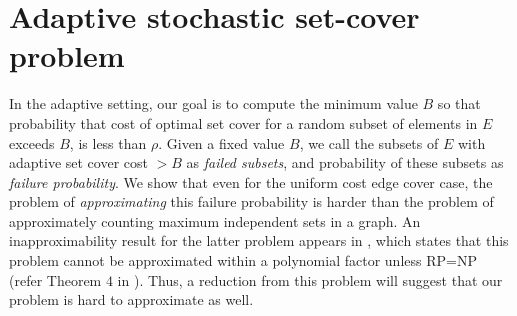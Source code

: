 \documentclass[11pt,onecolumn]{article}
\begin{document}
\section{Adaptive stochastic set-cover problem}
In the adaptive setting, our goal is to compute the minimum value $B$ so that probability that cost of optimal set cover for a random subset of elements in $E$ exceeds $B$, is less than $\rho$. Given a fixed value $B$, we call the subsets of $E$ with adaptive set cover cost $>B$ as {\it failed subsets}, and probability of these subsets as {\it failure probability}. We show that even for the uniform cost edge cover case, the problem of {\it approximating} this failure probability is harder than the problem of approximately counting maximum independent sets in a graph. 
An inapproximability result for the latter problem appears in \cite{luby-counting}, which states that this problem cannot be approximated within a polynomial factor unless RP=NP (refer Theorem $4$ in \cite{luby-counting}). 
Thus, a reduction from this problem will suggest that our problem is hard to approximate as well.
\end{document}
